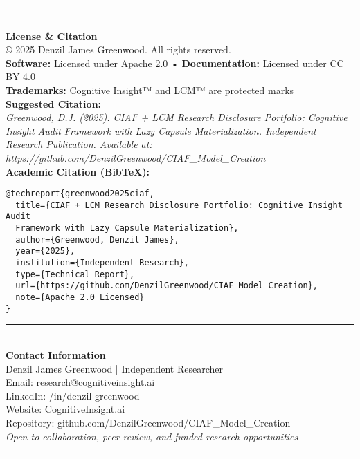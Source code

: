 \documentclass[12pt,a4paper]{article}
\begin{document}
\begin{center}
\textcolor{ciafgray}{\rule{0.8\textwidth}{0.4pt}}\\
\vspace{0.5cm}
\textbf{License \& Citation}\\
\vspace{0.3cm}
© 2025 Denzil James Greenwood. All rights reserved.\\
\textbf{Software:} Licensed under Apache 2.0 • \textbf{Documentation:} Licensed under CC BY 4.0\\
\textbf{Trademarks:} Cognitive Insight™ and LCM™ are protected marks\\
\vspace{0.2cm}
\textbf{Suggested Citation:}\\
\textit{Greenwood, D.J. (2025). CIAF + LCM Research Disclosure Portfolio: Cognitive Insight Audit Framework with Lazy Capsule Materialization. Independent Research Publication. Available at: https://github.com/DenzilGreenwood/CIAF\_Model\_Creation}\\
\vspace{0.3cm}
\textbf{Academic Citation (BibTeX):}\\
\begin{verbatim}
@techreport{greenwood2025ciaf,
  title={CIAF + LCM Research Disclosure Portfolio: Cognitive Insight Audit 
  Framework with Lazy Capsule Materialization},
  author={Greenwood, Denzil James},
  year={2025},
  institution={Independent Research},
  type={Technical Report},
  url={https://github.com/DenzilGreenwood/CIAF_Model_Creation},
  note={Apache 2.0 Licensed}
}
\end{verbatim}
\vspace{0.5cm}
\textcolor{ciafgray}{\rule{0.8\textwidth}{0.4pt}}\\
\vspace{0.5cm}
\textbf{Contact Information}\\
\vspace{0.3cm}
Denzil James Greenwood | Independent Researcher\\
Email: research@cognitiveinsight.ai\\
LinkedIn: /in/denzil-greenwood\\
Website: CognitiveInsight.ai\\
Repository: github.com/DenzilGreenwood/CIAF\_Model\_Creation\\
\vspace{0.3cm}
\textit{Open to collaboration, peer review, and funded research opportunities}\\
\vspace{0.5cm}
\textcolor{ciafgray}{\rule{0.8\textwidth}{0.4pt}}
\end{center}
\end{document}
